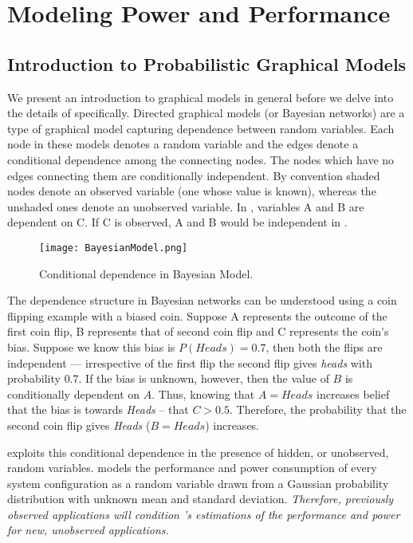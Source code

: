 \section{Modeling Power and Performance}
\label{sec:HBN}


\subsection{Introduction to Probabilistic Graphical Models}
We present an introduction to graphical models in general before we
delve into the details of \SYSTEMLEO{} specifically. Directed graphical
models (or Bayesian networks) are a type of graphical model capturing
dependence between random variables.  Each node in these models
denotes a random variable and the edges denote a conditional
dependence among the connecting nodes. The nodes which have no edges
connecting them are conditionally independent.  By convention shaded
nodes denote an observed variable (\ie one whose value is known),
whereas the unshaded ones denote an unobserved variable. In
, variables A and B are dependent on C.  If C is
observed, A and B would be independent in .


\begin{figure}
\begin{center}
	 \texttt{[image: BayesianModel.png]}
\end{center}
\vspace{-0.35em}
\caption{Conditional dependence in Bayesian Model.}
\label{fig:BN}
\end{figure}

The dependence structure in Bayesian networks can be understood using
a coin flipping example with a biased coin.  Suppose A represents the
outcome of the first coin flip, B represents that of second coin flip
and C represents the coin's bias.  Suppose we know this bias is
$P(Heads) = 0.7$, then both the flips are independent --- irrespective
of the first flip the second flip gives \textit{heads} with
probability $0.7$. If the bias is unknown, however, then the value of
$B$ is conditionally dependent on $A$.  Thus, knowing that $A = Heads$
increases belief that the bias is towards \textit{Heads} -- that $C >
0.5$.  Therefore, the probability that the second coin flip gives
\textit{Heads} (\ie $B = Heads$) increases.

\SYSTEMLEO{} exploits this conditional dependence in the presence of
hidden, or unobserved, random variables.  \SYSTEMLEO{} models the
performance and power consumption of every system configuration as a
random variable drawn from a Gaussian probability distribution with
unknown mean and standard deviation.  \emph{Therefore, previously
  observed applications will condition \SYSTEMLEO{}'s estimations of the
  performance and power for new, unobserved applications.}  

